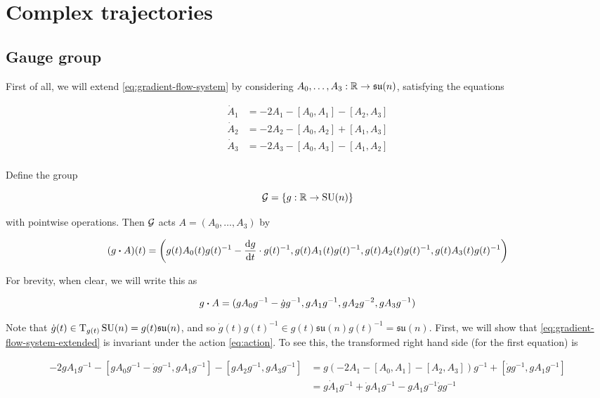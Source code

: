 \documentclass{report}
\DeclareMathOperator{\SU}{SU}
\newcommand{\su}{\mathfrak{su}}
\begin{document}
\section{Complex trajectories}

\subsection{Gauge group}

First of all, we will extend \cref{eq:gradient-flow-system} by considering \(A_0, \dots, A_3 : \R \to \su(n)\), satisfying the equations

\begin{equation}
    \label{eq:gradient-flow-system-extended}
    \begin{split}
        \dot A_1 &= -2A_1 - [A_0, A_1] - [A_2, A_3] \\
        \dot A_2 &= -2A_2 - [A_0, A_2] + [A_1, A_3] \\
        \dot A_3 &= -2A_3 - [A_0, A_3] - [A_1, A_2] \\
    \end{split}
\end{equation}

Define the group

\[\mcG = \left\{g : \R \to \SU(n)\right\}\]

with pointwise operations. Then \(\mathcal{G}\) acts \(A = (A_0, \dots, A_3)\) by

\begin{equation}
    \label{eq:action}
    (g \vdot A)(t) = \left(g(t)A_0(t)g(t)^{-1} - \dv{g}{t}(t) \cdot g(t)^{-1}, g(t)A_1(t)g(t)^{-1}, g(t)A_2(t)g(t)^{-1}, g(t)A_3(t)g(t)^{-1}\right)
\end{equation}

For brevity, when clear, we will write this as

\[g \vdot A = (gA_0g^{-1} - \dot g g^{-1}, gA_1g^{-1}, gA_2g^{-2}, gA_3g^{-1})\]

Note that \(\dot g(t) \in \TT_{g(t)}\SU(n) = g(t)\su(n)\), and so \(\dot g(t)g(t)^{-1} \in g(t)\su(n)g(t)^{-1} = \su(n)\). First, we will show that \cref{eq:gradient-flow-system-extended} is invariant under the action \cref{eq:action}. To see this, the transformed right hand side (for the first equation) is

\begin{align*}
    -2gA_1g^{-1} - [gA_0g^{-1} - \dot g g^{-1}, gA_1g^{-1}] - [gA_2g^{-1}, gA_3g^{-1}] &= g(-2A_1 - [A_0, A_1] - [A_2, A_3])g^{-1} + [\dot g g^{-1}, gA_1g^{-1}] \\
    &= g\dot A_1g^{-1} + \dot g A_1 g^{-1} - gA_1g^{-1}\dot g g^{-1} \\
\end{align*}
\end{document}
